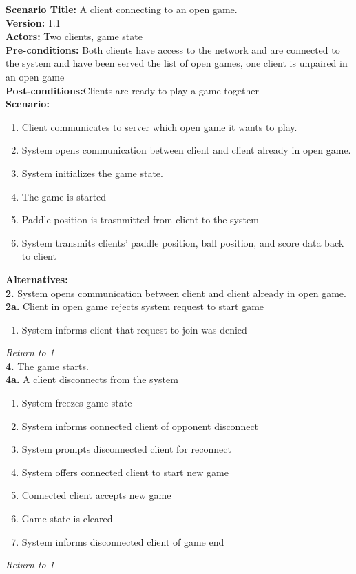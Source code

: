 \documentclass[letterpaper,12pt]{article}
\begin{document}
\noindent \textbf{Scenario Title:} A client connecting to an open game.\\
\textbf{Version:} 1.1\\
\textbf{Actors:} Two clients, game state\\
\textbf{Pre-conditions:} Both clients have access to the network and are connected to the system and have been served the list of open games, one client is unpaired in an open game\\
\textbf{Post-conditions:}Clients are ready to play a game together\\
\textbf{Scenario:}
\begin{enumerate}
\item Client communicates to server which open game it wants to play.
\item System opens communication between client and client already in open game.
\item System initializes the game state.
\item The game is started
\item Paddle position is trasnmitted from client to the system
\item System transmits clients' paddle position, ball position, and score data back to client
\end{enumerate}
\textbf{Alternatives:}\\
\textbf{2.} System opens communication between client and client already in open game.\\
\textbf{2a.} Client in open game rejects system request to start game 
\begin{enumerate}
\item System informs client that request to join was denied
\end{enumerate}
\emph{Return to 1}\\
\textbf{4.} The game starts.\\
\textbf{4a.} A client disconnects from the system
\begin{enumerate}
\item System freezes game state
\item System informs connected client of opponent disconnect
\item System prompts disconnected client for reconnect
\item System offers connected client to start new game
\item Connected client accepts new game
\item Game state is cleared
\item System informs disconnected client of game end
\end{enumerate}
\emph{Return to 1}\\
\end{document}

